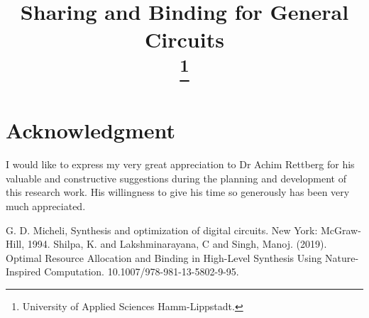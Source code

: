 \documentclass[conference]{IEEEtran}
\begin{document}
\title{Sharing and Binding for General Circuits\\
{\footnotesize }
\thanks{University of Applied Sciences Hamm-Lippstadt.}
}

\author{

}

\maketitle



 



 













\section*{Acknowledgment}
I would like to express my very great appreciation to Dr Achim Rettberg for his valuable and constructive suggestions during the planning and development of this research work. His willingness to give his time so generously has been very much appreciated.

\begin{thebibliography}{00}
 G. D. Micheli, Synthesis and optimization of digital circuits. New York: McGraw-Hill, 1994.
 Shilpa, K. and Lakshminarayana, C and Singh, Manoj. (2019). Optimal Resource Allocation and Binding in High-Level Synthesis Using Nature-Inspired Computation. 10.1007/978-981-13-5802-9-95.  
\end{thebibliography}
\end{document}

